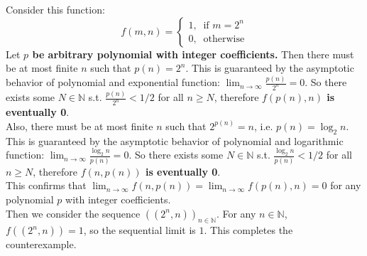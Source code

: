 \documentclass[lang=cn,11pt]{elegantbook}
\begin{document}
\begin{solution}
    Consider this function:
    $$
    f(m,n) =
\begin{cases} 
1, \;\; \text{if } m = 2^n \\ 
0, \;\; \text{otherwise} 
\end{cases}
$$
Let \textbf{$p$ be arbitrary polynomial with integer coefficients.} Then there must be at most finite $n$ such that $p(n) = 2^n$. This is guaranteed by the asymptotic behavior of polynomial and exponential function: $\lim_{n\to \infty} \frac{p(n)}{2^n} = 0$. So there exists some $N \in \mathbb{N}$ s.t. $\frac{p(n)}{2^n} < 1/2$ for all $n \geq N$, therefore \textbf{$f(p(n), n)$ is eventually 0}.\\
Also, there must be at most finite $n$ such that $2^{p(n)} = n$, i.e. $p(n) = \log_2 n$. This is guaranteed by the asymptotic behavior of polynomial and logarithmic function: $\lim_{n\to \infty} \frac{\log_2 n}{p(n)} = 0$. So there exists some $N \in \mathbb{N}$ s.t. $\frac{\log_2 n}{p(n)} < 1/2$ for all $n \geq N$, therefore \textbf{$f(n, p(n))$ is eventually 0}.\\
This confirms that $\lim_{n \to \infty} f(n, p(n)) = \lim_{n \to \infty} f(p(n), n) = 0$ for any polynomial $p$ with integer coefficients.\\
Then we consider the sequence $((2^n,n))_{n\in \mathbb{N}}$. For any $n\in\mathbb{N}$, $f((2^n,n))=1$, so the sequential limit is $1$. This completes the counterexample.
\end{solution}
\end{document}
